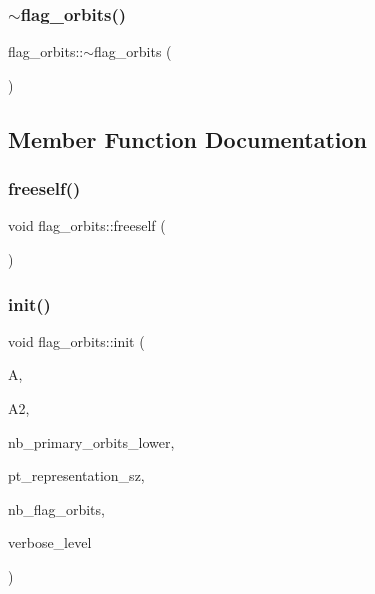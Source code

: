 \mbox{\label{classflag__orbits_ac0f8f26b0bf8b4b02f7aff6f54f79bab}} 
\subsubsection{\texorpdfstring{$\sim$flag\+\_\+orbits()}{~flag\_orbits()}}
{\footnotesize\ttfamily flag\+\_\+orbits\+::$\sim$flag\+\_\+orbits (\begin{DoxyParamCaption}{ }\end{DoxyParamCaption})}



\subsection{Member Function Documentation}
\mbox{\label{classflag__orbits_a05df171bfae44cbb7a8a007c570c69d8}} 
\subsubsection{\texorpdfstring{freeself()}{freeself()}}
{\footnotesize\ttfamily void flag\+\_\+orbits\+::freeself (\begin{DoxyParamCaption}{ }\end{DoxyParamCaption})}

\mbox{\label{classflag__orbits_a3319b31077e33267f1170b5febf07068}} 
\subsubsection{\texorpdfstring{init()}{init()}}
{\footnotesize\ttfamily void flag\+\_\+orbits\+::init (\begin{DoxyParamCaption}\item[{\mbox{\hyperlink{classaction}{action}} $\ast$}]{A,  }\item[{\mbox{\hyperlink{classaction}{action}} $\ast$}]{A2,  }\item[{\mbox{\hyperlink{galois_8h_a09fddde158a3a20bd2dcadb609de11dc}{I\+NT}}}]{nb\+\_\+primary\+\_\+orbits\+\_\+lower,  }\item[{\mbox{\hyperlink{galois_8h_a09fddde158a3a20bd2dcadb609de11dc}{I\+NT}}}]{pt\+\_\+representation\+\_\+sz,  }\item[{\mbox{\hyperlink{galois_8h_a09fddde158a3a20bd2dcadb609de11dc}{I\+NT}}}]{nb\+\_\+flag\+\_\+orbits,  }\item[{\mbox{\hyperlink{galois_8h_a09fddde158a3a20bd2dcadb609de11dc}{I\+NT}}}]{verbose\+\_\+level }\end{DoxyParamCaption})}

